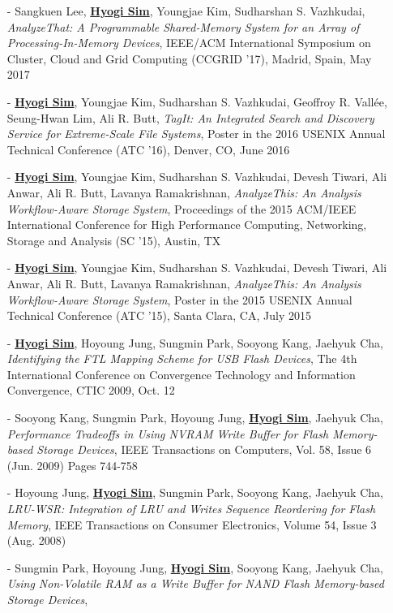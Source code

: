 \begin{itemize}[leftmargin=*]
\item[-] Sangkuen Lee, \underline{\bf Hyogi Sim}, Youngjae Kim,
  Sudharshan S. Vazhkudai,
  {\it AnalyzeThat: A Programmable Shared-Memory System for an Array of Processing-In-Memory Devices},
  IEEE/ACM International Symposium on Cluster, Cloud and Grid Computing
  (CCGRID '17), Madrid, Spain, May 2017
\item[-] \underline{\bf Hyogi Sim}, Youngjae Kim, Sudharshan S. Vazhkudai,
  Geoffroy R. Vall\'ee, Seung-Hwan Lim, Ali R. Butt,
  {\it TagIt: An Integrated Search and Discovery Service for Extreme-Scale File
  Systems},
  Poster in the 2016 USENIX Annual Technical Conference (ATC '16),
  Denver, CO, June 2016 %
\item[-] \underline{\bf Hyogi Sim}, Youngjae Kim, Sudharshan S. Vazhkudai,
  Devesh Tiwari, Ali Anwar, Ali R. Butt, Lavanya Ramakrishnan,
  {\it AnalyzeThis: An Analysis Workflow-Aware Storage System},
  Proceedings of the 2015 ACM/IEEE International Conference for High
  Performance Computing, Networking, Storage and Analysis (SC '15), Austin, TX
\item[-] \underline{\bf Hyogi Sim}, Youngjae Kim, Sudharshan S. Vazhkudai,
  Devesh Tiwari, Ali Anwar, Ali R. Butt, Lavanya Ramakrishnan,
  {\it AnalyzeThis: An Analysis Workflow-Aware Storage System},
  Poster in the 2015 USENIX Annual Technical Conference (ATC '15),
  Santa Clara, CA, July 2015
\item[-] \underline{\bf Hyogi Sim}, Hoyoung Jung, Sungmin Park, Sooyong Kang, Jaehyuk Cha,
  {\it Identifying the FTL Mapping Scheme for USB Flash Devices},
  The 4th International Conference on Convergence Technology
  and Information Convergence, CTIC 2009, Oct. 12
\item[-] Sooyong Kang, Sungmin Park, Hoyoung Jung, \underline{\bf Hyogi Sim}, Jaehyuk Cha,
  {\it Performance Tradeoffs in Using NVRAM Write Buffer for Flash Memory-based
  Storage Devices},
  IEEE Transactions on Computers, Vol. 58, Issue 6 (Jun. 2009) Pages 744-758
\item[-] Hoyoung Jung, \underline{\bf Hyogi Sim}, Sungmin Park, Sooyong Kang, Jaehyuk Cha,
 {\it LRU-WSR: Integration of LRU and Writes Sequence Reordering for Flash
 Memory},
 IEEE Transactions on Consumer Electronics, Volume 54, Issue 3 (Aug. 2008)
\item[-] Sungmin Park, Hoyoung Jung, \underline{\bf Hyogi Sim}, Sooyong Kang, Jaehyuk Cha,
 {\it Using Non-Volatile RAM as a Write Buffer for NAND Flash Memory-based
 Storage Devices},

\end{itemize}
